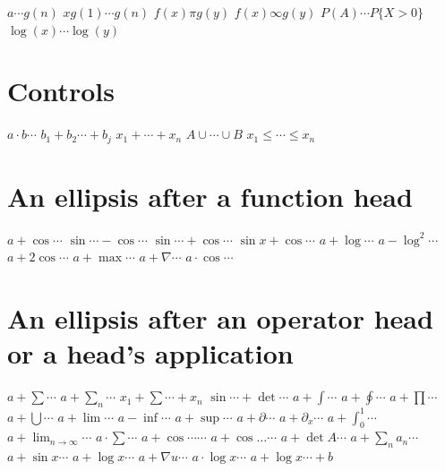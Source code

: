 \documentclass{article}
\begin{document}
$a\cdots g(n)$ $x g(1)\cdots g(n)$ $f(x)\pi g(y)$ $f(x)\infty g(y)$ $P(A)\cdots P\{X>0\}$ $\log(x)\cdots\log(y)$

\section{Controls}
$a\cdot b\cdots$ $b_1+b_2\cdots+b_j$ $x_1+\cdots+x_n$ $A\cup\cdots\cup B$ $x_1\le\cdots\le x_n$

\section{An ellipsis after a function head}
$a+\cos\cdots$ $\sin\cdots-\cos\cdots$ $\sin\cdots+\cos\cdots$ $\sin x+\cos\cdots$ $a+\log\cdots$ $a-\log^2\cdots$
$a+2\cos\cdots$ $a+\max\cdots$ $a+\nabla\cdots$ $a\cdot\cos\cdots$

\section{An ellipsis after an operator head or a head's application}
$a+\sum\cdots$ $a+\sum_n\cdots$ $x_1+\sum\cdots+x_n$ $\sin\cdots+\det\cdots$ $a+\int\cdots$ $a+\oint\cdots$ $a+\prod\cdots$
$a+\bigcup\cdots$ $a+\lim\cdots$ $a-\inf\cdots$ $a+\sup\cdots$ $a+\partial\cdots$ $a+\partial_x\cdots$ $a+\int_0^1\cdots$
$a+\lim_{n\to\infty}\cdots$ $a\cdot\sum\cdots$
$a+\cos\cdots\cdots$ $a+\cos\ldots\cdots$ $a+\det A\cdots$ $a+\sum_n a_n\cdots$ $a+\sin x\cdots$ $a+\log x\cdots$
$a+\nabla u\cdots$ $a\cdot\log x\cdots$ $a+\log x\cdots+b$
\end{document}
